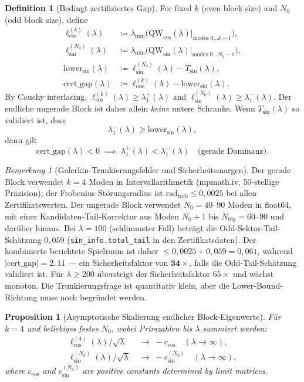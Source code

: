 ﻿\documentclass[12pt,a4paper]{article}
\newtheorem{proposition}[theorem]{Proposition}
\theoremstyle{definition}
\newtheorem{definition}[theorem]{Definition}
\theoremstyle{remark}
\newtheorem{remark}[theorem]{Bemerkung}
\begin{document}
\begin{definition}[Bedingt zertifiziertes Gap]
For fixed $k$ (even block size) and $N_0$ (odd block size), define
\begin{align*}
  \ell_{\cos}^{(k)}(\lambda) &\coloneqq \lambda_{\min}\!\bigl(\mathrm{QW}_{\cos}(\lambda)\big|_{\text{modes }0\ldots k-1}\bigr), \\
  \ell_{\sin}^{(N_0)}(\lambda) &\coloneqq \lambda_{\min}\!\bigl(\mathrm{QW}_{\sin}(\lambda)\big|_{\text{modes }0\ldots N_0-1}\bigr), \\
  \mathrm{lower}_{\sin}(\lambda) &\coloneqq \ell_{\sin}^{(N_0)}(\lambda)-T_{\sin}(\lambda), \\
  \mathrm{cert\_gap}(\lambda) &\coloneqq \ell_{\cos}^{(k)}(\lambda) - \mathrm{lower}_{\sin}(\lambda).
\end{align*}
By Cauchy interlacing, $\ell_{\cos}^{(k)}(\lambda) \geq \lambda_1^+(\lambda)$ and $\ell_{\sin}^{(N_0)}(\lambda) \geq \lambda_1^-(\lambda)$. Der endliche ungerade Block ist daher allein \emph{keine} untere Schranke. Wenn $T_{\sin}(\lambda)$ so validiert ist, dass
\[
  \lambda_1^-(\lambda) \geq \mathrm{lower}_{\sin}(\lambda),
\]
dann gilt
\[
  \mathrm{cert\_gap}(\lambda) < 0 \;\implies\; \lambda_1^+(\lambda) < \lambda_1^-(\lambda) \quad\text{(gerade Dominanz).}
\]
\end{definition}

\begin{remark}[Galerkin-Trunkierungsfehler und Sicherheitsmargen]
\label{rem:galerkin-safety}
Der gerade Block verwendet $k = 4$ Moden in Intervallarithmetik (mpmath.iv, 50-stellige Präzision); der Frobenius-Störungsradius ist $\mathrm{rad}_{\mathrm{frob}} \leq 0{,}0025$ bei allen Zertifikatswerten. Der ungerade Block verwendet $N_0 = 40$--$90$ Moden in float64, mit einer Kandidaten-Tail-Korrektur aus Moden $N_0+1$ bis $N_{\mathrm{big}} = 60$--$90$ und darüber hinaus. Bei $\lambda = 100$ (schlimmster Fall) beträgt die Odd-Sektor-Tail-Schätzung $0{,}059$ (\texttt{sin\_info.total\_tail} in den Zertifikatsdaten). Der kombinierte berichtete Spielraum ist daher $\leq 0{,}0025 + 0{,}059 = 0{,}061$, während $|\mathrm{cert\_gap}| = 2{,}11$ --- ein Sicherheitsfaktor von $\mathbf{34\times}$, falls die Odd-Tail-Schätzung validiert ist. Für $\lambda \geq 200$ übersteigt der Sicherheitsfaktor $65\times$ und wächst monoton. Die Trunkierungsfrage ist quantitativ klein, aber die Lower-Bound-Richtung muss noch begründet werden.
\end{remark}

\begin{proposition}[Asymptotische Skalierung endlicher Block-Eigenwerte]
\label{prop:scaling}
Für $k = 4$ und beliebiges festes $N_0$, wobei Primzahlen bis $\lambda$ summiert werden:
\begin{align}
  \ell_{\cos}^{(4)}(\lambda) / \sqrt{\lambda} &\;\to\; -c_{\cos} \quad (\lambda \to \infty), \label{eq:ccos-limit} \\
  \ell_{\sin}^{(N_0)}(\lambda) / \sqrt{\lambda} &\;\to\; -c_{\sin}^{(N_0)} \quad (\lambda \to \infty), \label{eq:csin-limit}
\end{align}
where $c_{\cos}$ and $c_{\sin}^{(N_0)}$ are positive constants determined by limit matrices.
\end{proposition}
\end{document}
